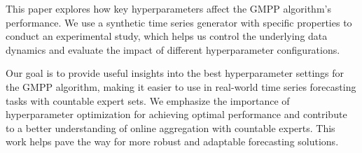 \documentclass{icorsdssv2024}
\begin{document}
%
%
%
%

This paper explores how key hyperparameters affect the GMPP algorithm's performance. We use a synthetic time series generator with specific properties to conduct an experimental study, which helps us control the underlying data dynamics and evaluate the impact of different hyperparameter configurations.

Our goal is to provide useful insights into the best hyperparameter settings for the GMPP algorithm, making it easier to use in real-world time series forecasting tasks with countable expert sets. We emphasize the importance of hyperparameter optimization for achieving optimal performance and contribute to a better understanding of online aggregation with countable experts. This work helps pave the way for more robust and adaptable forecasting solutions.
\end{document}
